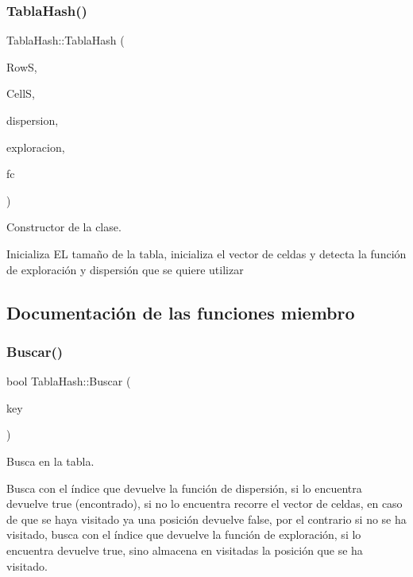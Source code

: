 \subsubsection{\texorpdfstring{Tabla\+Hash()}{TablaHash()}}
{\footnotesize\ttfamily Tabla\+Hash\+::\+Tabla\+Hash (\begin{DoxyParamCaption}\item[{int}]{RowS,  }\item[{int}]{CellS,  }\item[{char $\ast$}]{dispersion,  }\item[{char $\ast$}]{exploracion,  }\item[{float}]{fc }\end{DoxyParamCaption})}



Constructor de la clase. 

Inicializa EL tamaño de la tabla, inicializa el vector de celdas y detecta la función de exploración y dispersión que se quiere utilizar 

\subsection{Documentación de las funciones miembro}
\mbox{\label{classTablaHash_a063c478c2acb24fdba7bbc90c9d6bda9}} 
\subsubsection{\texorpdfstring{Buscar()}{Buscar()}}
{\footnotesize\ttfamily bool Tabla\+Hash\+::\+Buscar (\begin{DoxyParamCaption}\item[{\hyperlink{classDNI}{D\+NI} \&}]{key }\end{DoxyParamCaption})}



Busca en la tabla. 

Busca con el índice que devuelve la función de dispersión, si lo encuentra devuelve true (encontrado), si no lo encuentra recorre el vector de celdas, en caso de que se haya visitado ya una posición devuelve false, por el contrario si no se ha visitado, busca con el índice que devuelve la función de exploración, si lo encuentra devuelve true, sino almacena en visitadas la posición que se ha visitado. \mbox{\label{classTablaHash_a3030b51cfd5a0e50d796cc6c2383ab33}} 
